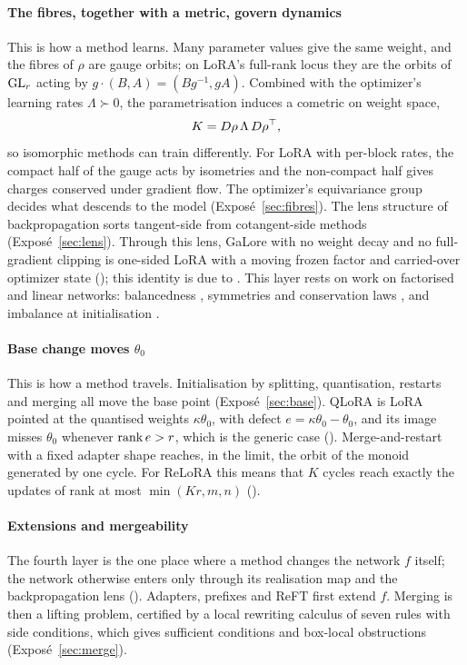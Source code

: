 \paragraph{The fibres, together with a metric, govern dynamics}
This is how a method learns. Many parameter values give the same weight, and the fibres of $\rho$ are gauge orbits; on LoRA's full-rank locus they are the orbits of $\mathrm{GL}_r$ acting by $g\cdot(B,A)=(Bg^{-1},gA)$. Combined with the optimizer's learning rates $\Lambda\succ0$, the parametrisation induces a cometric on weight space,
\[
  K=D\rho\,\Lambda\,D\rho^{\top} ,
\]
so isomorphic methods can train differently. For LoRA with per-block rates, the compact half of the gauge acts by isometries and the non-compact half gives charges conserved under gradient flow. The optimizer's equivariance group decides what descends to the model (Exposé~\ref{sec:fibres}). The lens structure of backpropagation sorts tangent-side from cotangent-side methods (Exposé~\ref{sec:lens}). Through this lens, GaLore \citep{zhao2024galore} with no weight decay and no full-gradient clipping is one-sided LoRA with a moving frozen factor and carried-over optimizer state (); this identity is due to \citet{xtorrobahennigen2025duality}. This layer rests on work on factorised and linear networks: balancedness \citep{du2018algorithmic,arora2018optimization}, symmetries and conservation laws \citep{kunin2020neural,zhao2022symmetries}, and imbalance at initialisation \citep{xtarmoun2021understanding,xmin2021explicit}.

\paragraph{Base change moves $\theta_0$}
This is how a method travels. Initialisation by splitting, quantisation, restarts and merging all move the base point (Exposé~\ref{sec:base}). QLoRA \citep{dettmers2023qlora} is LoRA pointed at the quantised weights $\kappa\theta_0$, with defect $e=\kappa\theta_0-\theta_0$, and its image misses $\theta_0$ whenever $\operatorname{rank} e>r$, which is the generic case (). Merge-and-restart with a fixed adapter shape reaches, in the limit, the orbit of the monoid generated by one cycle. For ReLoRA \citep{lialin2023relora} this means that $K$ cycles reach exactly the updates of rank at most $\min(Kr,m,n)$ ().

\paragraph{Extensions and mergeability}
The fourth layer is the one place where a method changes the network $f$ itself; the network otherwise enters only through its realisation map and the backpropagation lens (). Adapters, prefixes and ReFT first extend $f$. Merging is then a lifting problem, certified by a local rewriting calculus of seven rules with side conditions, which gives sufficient conditions and box-local obstructions (Exposé~\ref{sec:merge}).

